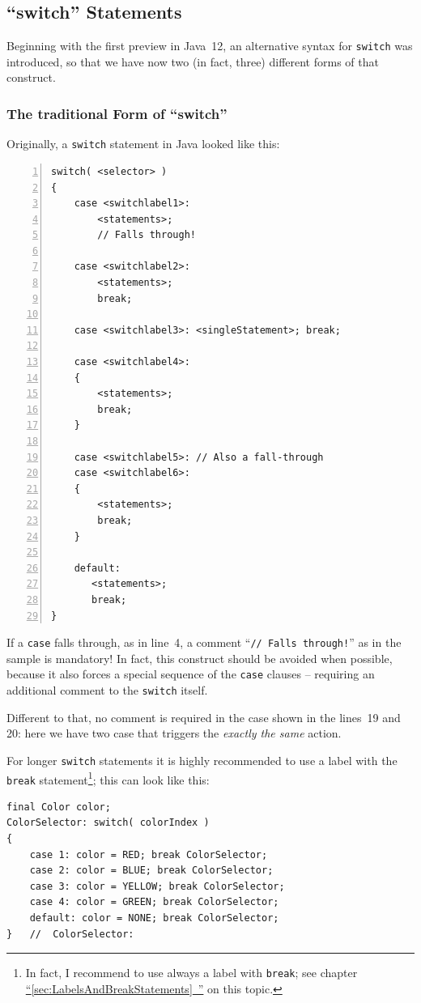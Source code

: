 \documentclass[11pt,a4paper, titlepage, parskip=half, headsepline, footsepline, cleardoublepage=current, headheight=1cm]{scrbook}
\newcommand*{\tqfullref}[1]{\hyperref[{#1}]{“\ref*{#1}~\nameref*{#1}”}}
\begin{document}
\subsection{“switch” Statements}\label{sec:SwitchStatements}
Beginning with the first preview in Java~12, an alternative syntax for \lstinline|switch| was introduced, so that we have now two (in fact, three) different forms of that construct.

\subsubsection{The traditional Form of “switch”}
Originally, a \lstinline|switch| statement in Java looked like this:
\begin{lstlisting}[numbers=left]
switch( <selector> )
{
    case <switchlabel1>:
        <statements>;
        // Falls through!

    case <switchlabel2>:
        <statements>;
        break;

    case <switchlabel3>: <singleStatement>; break;

    case <switchlabel4>:
    {
        <statements>;
        break;
    }

    case <switchlabel5>: // Also a fall-through
    case <switchlabel6>:
    {
        <statements>;
        break;
    }

    default:
       <statements>;
       break;
}
\end{lstlisting}

If a \lstinline|case| falls through, as in line~4, a comment “\lstinline|// Falls through!|” as in the sample is mandatory! In fact, this construct should be avoided when possible, because it also forces a special sequence of the \lstinline|case| clauses – requiring an additional comment to the \lstinline|switch| itself.

Different to that, no comment is required in the case shown in the lines~19 and 20: here we have two case that triggers the \textit{exactly the same} action.

For longer \lstinline|switch| statements it is highly recommended to use a label with the \lstinline|break| statement\footnote{In fact, I recommend to use always a label with \lstinline|break|; see chapter \tqfullref{sec:LabelsAndBreakStatements} on this topic.}; this can look like this:
\begin{lstlisting}
final Color color;
ColorSelector: switch( colorIndex )
{
    case 1: color = RED; break ColorSelector;
    case 2: color = BLUE; break ColorSelector;
    case 3: color = YELLOW; break ColorSelector;
    case 4: color = GREEN; break ColorSelector;
    default: color = NONE; break ColorSelector;
}   //  ColorSelector:
\end{lstlisting}
\end{document}

